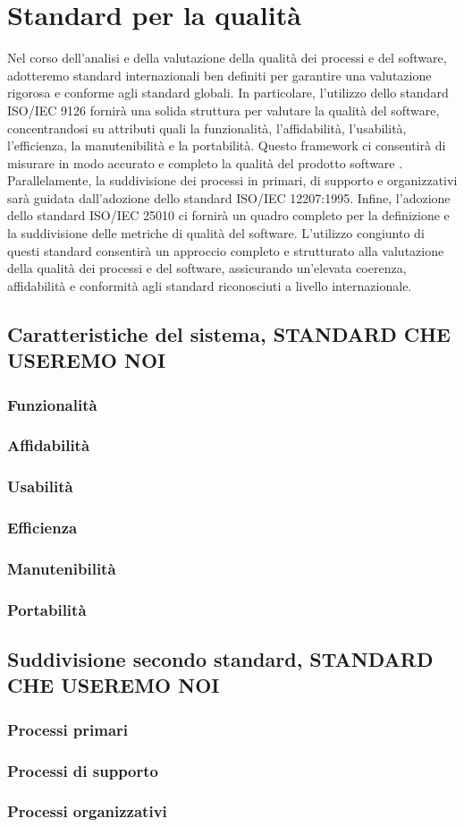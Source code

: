 \section{Standard per la qualità}
Nel corso dell’analisi e della valutazione della qualità dei processi e del software, adotteremo standard internazionali ben definiti per garantire una valutazione rigorosa e conforme agli standard globali. In particolare, l’utilizzo dello standard ISO/IEC 9126 fornirà una solida struttura per valutare la qualità del software, concentrandosi su attributi quali la funzionalità, l’affidabilità, l’usabilità, l’efficienza, la manutenibilità e la portabilità. Questo framework ci consentirà di misurare in modo accurato e completo la qualità del prodotto software .
Parallelamente, la suddivisione dei processi in primari, di supporto e organizzativi sarà guidata dall’adozione dello standard ISO/IEC 12207:1995. Infine, l’adozione dello standard ISO/IEC 25010 ci fornirà un quadro completo per la definizione e la suddivisione delle metriche di qualità del software. L’utilizzo congiunto di questi standard consentirà un approccio completo e strutturato alla valutazione della qualità dei processi e del software, assicurando un’elevata coerenza, affidabilità e conformità agli standard riconosciuti a livello internazionale.

\subsection{Caratteristiche del sistema, STANDARD CHE USEREMO NOI}
\subsubsection{Funzionalità}
\subsubsection{Affidabilità}
\subsubsection{Usabilità}
\subsubsection{Efficienza}
\subsubsection{Manutenibilità}
\subsubsection{Portabilità}
\subsection{Suddivisione secondo standard, STANDARD CHE USEREMO NOI}
\subsubsection{Processi primari}
\subsubsection{Processi di supporto}
\subsubsection{Processi organizzativi}
